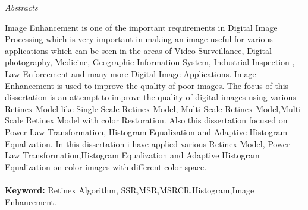 \newpage
\thispagestyle{empty}

\begin{center}
\emph{\LARGE Abstracts}\\[2.5cm]
\end{center}

\normalsize Image Enhancement is one of the important requirements in Digital Image
Processing which is very important in making an image useful for various applications which can be seen in the areas of Video Surveillance, Digital photography, Medicine, Geographic Information System, Industrial Inspection , Law Enforcement and many more Digital Image Applications. Image Enhancement is used to improve the quality of poor images. The focus of this dissertation is an attempt to improve the quality of digital images using various Retinex Model like Single Scale Retinex Model, Multi-Scale Retinex Model,Multi-Scale Retinex Model with color Restoration. Also this dissertation focused on Power Law Transformation, Histogram Equalization and Adaptive Histogram Equalization. In this dissertation i have applied various Retinex Model, Power Law Transformation,Histogram Equalization and Adaptive Histogram Equalization on color images with different color space.\\\\
\textbf{Keyword:} Retinex Algorithm, SSR,MSR,MSRCR,Histogram,Image Enhancement. \\[1.0cm]







